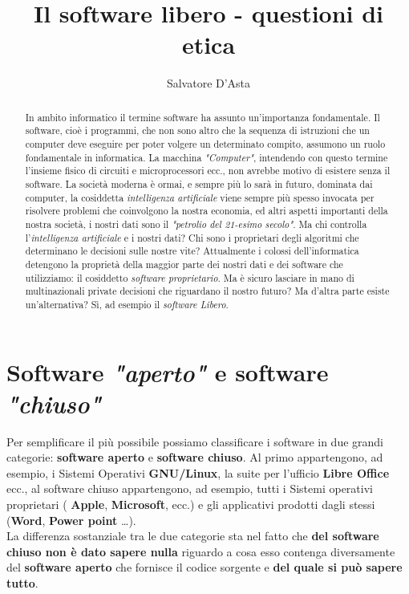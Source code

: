 \documentclass[]{article}
\title{Il software libero - questioni di etica }
\author{Salvatore D'Asta}
\begin{document}
\maketitle

\begin{abstract}
In ambito informatico il termine software ha assunto un'importanza fondamentale. Il software, cioè i programmi, che non sono altro che  la sequenza di istruzioni che  un computer deve eseguire per poter volgere un determinato compito, assumono un ruolo fondamentale in informatica. La macchina \textit{"Computer"}, intendendo con questo termine l'insieme fisico di circuiti e microprocessori ecc., non avrebbe motivo di esistere senza il software. La società moderna è ormai, e sempre più lo sarà in futuro, dominata dai computer, la cosiddetta \textit{intelligenza artificiale} viene sempre più spesso invocata per risolvere problemi che coinvolgono la nostra economia, ed altri aspetti importanti della nostra società, i nostri dati sono il \textit{"petrolio del 21-esimo secolo"}. Ma chi controlla l'\textit{intelligenza artificiale} e i nostri dati? Chi sono i proprietari degli algoritmi che determinano le decisioni sulle nostre vite? Attualmente i colossi dell'informatica detengono la proprietà della maggior parte dei nostri dati e dei software che utilizziamo: il cosiddetto \textit{software proprietario}. Ma è sicuro lasciare in mano di multinazionali private decisioni che riguardano il nostro futuro? Ma d'altra parte esiste un'alternativa? Sì, ad esempio il \textit{software Libero}.       
\end{abstract}


\section{Software\textit{ "aperto"} e software \textit{"chiuso"}}
Per semplificare il più possibile possiamo classificare i software in due grandi categorie: \textbf{software aperto} e \textbf{software chiuso}. Al primo appartengono, ad esempio, i Sistemi Operativi \textbf{GNU/Linux}, la suite per l’ufficio \textbf{Libre Office} ecc.,  al software chiuso appartengono, ad esempio, tutti i Sistemi operativi proprietari ( \textbf{Apple}, \textbf{Microsoft}, ecc.) e gli applicativi prodotti dagli stessi (\textbf{Word}, \textbf{Power point} …). \\  

La differenza sostanziale tra le due categorie sta nel fatto che \textbf{del software chiuso non è dato sapere nulla} riguardo a cosa esso contenga diversamente del \textbf{software aperto} che fornisce il codice sorgente e \textbf{del quale si può sapere tutto}. \\
\end{document}
